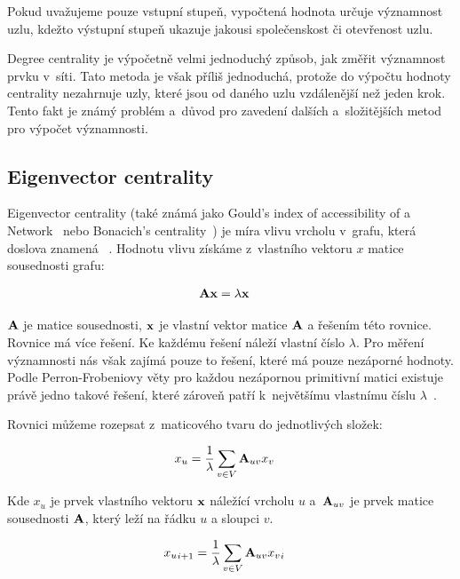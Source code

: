 \documentclass{bakalarka}
\begin{document}
Pokud uvažujeme pouze vstupní stupeň, vypočtená hodnota určuje významnost uzlu,
kdežto výstupní stupeň ukazuje jakousi společenskost či otevřenost uzlu. 

Degree centrality je výpočetně velmi jednoduchý způsob, jak změřit významnost
prvku v~síti. Tato metoda je však příliš jednoduchá, protože do výpočtu hodnoty
centrality nezahrnuje uzly, které jsou od daného uzlu vzdálenější než jeden
krok. Tento fakt je známý problém a~důvod pro zavedení dalších a~složitějších
metod pro výpočet významnosti.


\subsection{Eigenvector centrality}
Eigenvector centrality (také známá jako Gould's index of accessibility of a
Network~\citep{williams2007} nebo Bonacich's
centrality~\citep{hannemanriddle2005}) je míra vlivu vrcholu v~grafu, která
doslova znamená ~\citep{zweigiyengar2010}. Hodnotu vlivu získáme z~vlastního vektoru
$x$ matice sousednosti grafu:

\begin{align*}
{\bf Ax} &= \lambda {\bf x}
\end{align*}

${\bf A}$ je matice sousednosti, ${\bf x}$ je vlastní vektor matice ${\bf A}$ a
řešením této rovnice. Rovnice má více řešení. Ke každému řešení náleží vlastní
číslo $\lambda$. Pro měření významnosti nás však zajímá pouze to řešení, které
má pouze nezáporné hodnoty. Podle Perron-Frobeniovy věty pro každou nezápornou
primitivní matici existuje právě jedno takové řešení, které zároveň patří
k~největšímu vlastnímu číslu $\lambda$~\citep{langvillemeyer}.

Rovnici můžeme rozepsat z~maticového tvaru do jednotlivých složek:

\begin{align*} 
x_u &=  \frac{1}{\lambda} \displaystyle\sum_{v \in V} {\bf A}_{uv} x_v 
\end{align*} 

Kde $x_u$ je prvek vlastního vektoru ${\bf x}$ náležící vrcholu $u$ a~${\bf
A}_{uv}$ je prvek matice sousednosti ${\bf A}$, který leží na řádku $u$ a
sloupci $v$.

\begin{align*} 
{x_u}_{i + 1} &=  \frac{1}{\lambda} \displaystyle\sum_{v \in V} {\bf A}_{uv}
{x_v}_{i}
\end{align*} 
\end{document}
